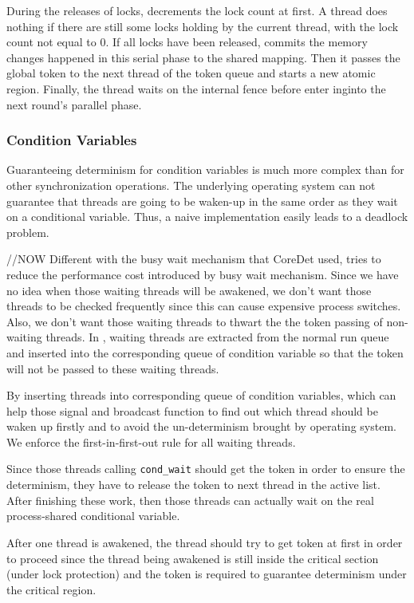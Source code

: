 During the releases of locks, \dthreads{} decrements the lock count at first. A thread does nothing if there are still some locks holding by the current thread, with the lock count not equal to 0. If all locks have been released, \dthreads{} commits the memory changes happened in this serial phase to the shared mapping. Then it passes the global token to the next thread of the token queue and starts a new atomic region. Finally, the thread waits on the internal fence before enter inginto the next round's parallel phase.

\subsubsection{Condition Variables}
\label{sec:condwait}

Guaranteeing determinism for condition variables is much more complex than for other synchronization operations. The underlying operating system can not guarantee that threads are going to be waken-up in the same order as they wait on a conditional variable. Thus, a naive implementation easily leads to a deadlock problem.

//NOW
Different with the busy wait mechanism that CoreDet used, 
\dthreads{} tries to reduce the performance cost
introduced by busy wait mechanism. Since we have no idea when those
waiting threads will be awakened, we don't want those threads to be
checked frequently since this can cause expensive process
switches. Also, we don't want those waiting threads to thwart the the
token passing of non-waiting threads.
In \dthreads{}, waiting threads are extracted from the normal run
queue and inserted into the corresponding queue of condition
variable so that the token will not be passed to these waiting
threads.

By inserting threads into corresponding queue of condition
variables, which can help those signal and broadcast function to find
out which thread should be waken up firstly and to avoid the
un-determinism brought by operating system. We enforce the
first-in-first-out rule for all waiting threads.

Since those threads calling \texttt{cond\_wait} should get the token in order
to ensure the determinism, they have to release the token to next
thread in the active list. After finishing these work, then those
threads can actually wait on the real process-shared conditional
variable.

After one thread is awakened, the thread should try to get token at
first in order to proceed since the thread being awakened is 
still inside the critical section (under lock protection)
and the token is required to guarantee determinism under the critical region. 


